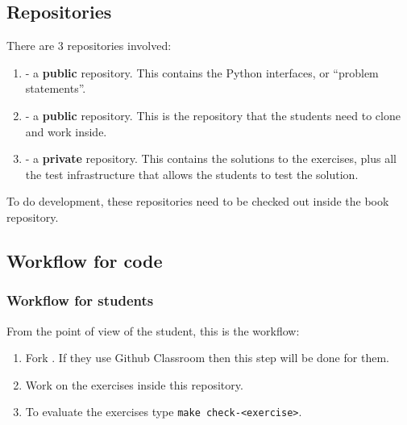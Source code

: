 

\subsection{Repositories}
There are 3 repositories involved:
\begin{enumerate}
	\item {} - a \textbf{public} repository.
	      This contains the Python interfaces, or ``problem statements''.
	\item {} - a \textbf{public} repository.
	      This is the repository that the students need to clone and work inside.
	\item {} - a \textbf{private} repository.
	      This contains the solutions to the exercises, plus all the test infrastructure that allows the students to test the solution.
\end{enumerate}

To do development, these repositories need to be checked out inside the book repository.

\subsection{Workflow for code}

\subsubsection{Workflow for students}

From the point of view of the student, this is the workflow:

\begin{enumerate}
	\item Fork .
	      If they use Github Classroom then this step will be done for them.
	\item Work on the exercises inside this repository.
	\item To evaluate the exercises type \texttt{make check-<exercise>}.
\end{enumerate}

